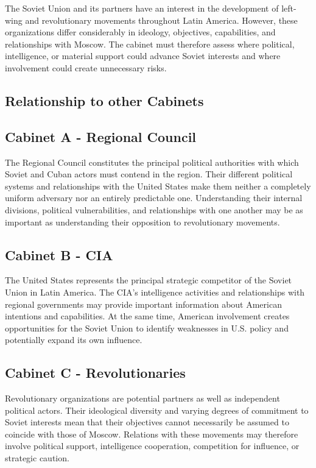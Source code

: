 The Soviet Union and its partners have an interest in the development of left-wing and revolutionary movements throughout Latin America. However, these organizations differ considerably in ideology, objectives, capabilities, and relationships with Moscow. The cabinet must therefore assess where political, intelligence, or material support could advance Soviet interests and where involvement could create unnecessary risks.

\subsection{Relationship to other Cabinets}

\subsection{Cabinet A - Regional Council}

The Regional Council constitutes the principal political authorities with which Soviet and Cuban actors must contend in the region. Their different political systems and relationships with the United States make them neither a completely uniform adversary nor an entirely predictable one. Understanding their internal divisions, political vulnerabilities, and relationships with one another may be as important as understanding their opposition to revolutionary movements.

\subsection{Cabinet B - CIA}

The United States represents the principal strategic competitor of the Soviet Union in Latin America. The CIA's intelligence activities and relationships with regional governments may provide important information about American intentions and capabilities. At the same time, American involvement creates opportunities for the Soviet Union to identify weaknesses in U.S. policy and potentially expand its own influence.

\subsection{Cabinet C - Revolutionaries}

Revolutionary organizations are potential partners as well as independent political actors. Their ideological diversity and varying degrees of commitment to Soviet interests mean that their objectives cannot necessarily be assumed to coincide with those of Moscow. Relations with these movements may therefore involve political support, intelligence cooperation, competition for influence, or strategic caution.
